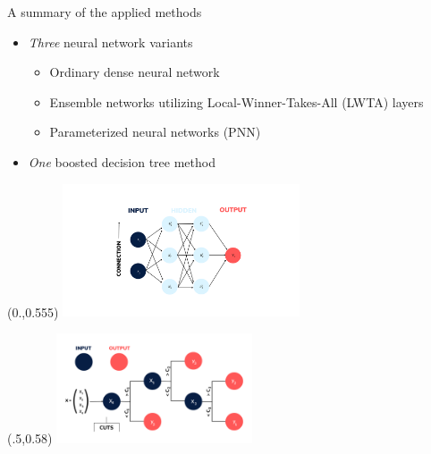 \documentclass[UKenglish]{beamer}
\begin{document}
\begin{frame}{A summary of the applied methods}
    \begin{itemize}

    \item \emph{Three} neural network variants
    \begin{itemize}
        \item Ordinary dense neural network
        \item Ensemble networks utilizing Local-Winner-Takes-All (LWTA) layers
        \item Parameterized neural networks (PNN)
    \end{itemize}

    \item \emph{One} boosted decision tree method

    \end{itemize}

    \begin{textblock}{1}(0.,0.555)
        \includegraphics[width=0.525\textwidth]{figures/Input_labels.png}
    \end{textblock}
    \begin{textblock}{1}(.5,0.58)
        \includegraphics[width=0.435\textwidth]{figures/DT.png}
    \end{textblock}
\end{frame}
\end{document}
